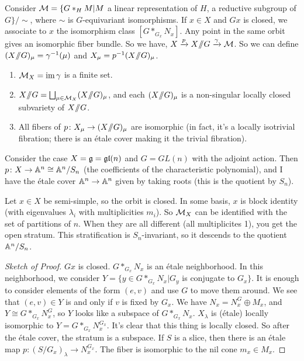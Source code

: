 Consider $\M=\{G*_H M|M$ a linear representation of $H$, a reductive subgroup of $G\}/\sim$, where $\sim$ is $G$-equivariant isomorphisms. If $x\in X$ and $Gx$ is closed, we associate to $x$ the isomorphism class $[G*_{G_x}N_x]$. Any point in the same orbit gives an isomorphic fiber bundle. So we have, $X\xrightarrow p X\quot G\xrightarrow \ga \M$. So we can define $(X\quot G)_\mu=\ga^{-1}(\mu)$ and $X_\mu=p^{-1}(X\quot G)_\mu$.
\begin{theorem}
 \begin{enumerate}
  \item $\M_X=\im \ga$ is a finite set.
  \item $X\quot G = \bigsqcup_{\mu\in \M_X} (X\quot G)_\mu$, and each $(X\quot G)_\mu$ is a non-singular locally closed subvariety of $X\quot G$.
  \item All fibers of $p\colon X_\mu\to (X\quot G)_\mu$ are isomorphic (in fact, it's a locally isotrivial fibration; there is an \'etale cover making it the trivial fibration).
 \end{enumerate}
\end{theorem}
\begin{example}
 Consider the case $X=\g=\gl(n)$ and $G=GL(n)$ with the adjoint action. Then $p\colon X\to \AA^n\cong \AA^n/S_n$ (the coefficients of the characteristic polynomial), and I have the \'etale cover $\AA^n\to \AA^n$ given by taking roots (this is the quotient by $S_n$).
 
 Let $x\in X$ be semi-simple, so the orbit is closed. In some basis, $x$ is block identity (with eigenvalues $\lambda_i$ with multiplicities $m_i$). So $\M_X$ can be identified with the set of partitions of $n$. When they are all different (all multiplicites 1), you get the open stratum. This stratification is $S_n$-invariant, so it descends to the quotient $\AA^n/S_n$. 
\end{example}
\begin{proof}[Sketch of Proof]
 $Gx$ is closed. $G*_{G_x}N_x$ is an \'etale neighborhood. In this neighborhood, we consider $Y=\{y\in G*_{G_x}N_x|G_y$ is conjugate to $G_x\}$. It is enough to consider elements of the form $(e,v)$ and use $G$ to move them around. We see that $(e,v)\in Y$ is and only if $v$ is fixed by $G_x$. We have $N_x=N_x^G\oplus M_x$, and $Y\cong G*_{G_x}N_x^G$, so $Y$ looks like a subspace of $G*_{G_x}N_x$. $X_\lambda$ is (\'etale) locally isomorphic to $Y=G*_{G_x}N_x^{G_x}$. It's clear that this thing is locally closed. So after the \'etale cover, the stratum is a subspace. If $S$ is a slice, then there is an \'etale map $p\colon (S/G_x)_\lambda\to N_x^{G_x}$. The fiber is isomorphic to the nil cone $m_x\in M_x$.
\end{proof}
